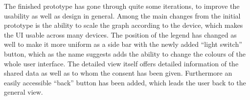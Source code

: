 \documentclass[../paper.tex]{subfiles}
\begin{document}
  The finished prototype has gone through quite some iterations, to improve
  the usability as well as design in general. Among the main changes from the
  initial prototype is the ability to scale the graph according to the device, which
  makes the UI usable across many devices. The position of the legend has changed
  as well to make it more uniform as a side bar with the newly added ``light switch''
  button, which as the name suggests adds the ability to change the colours of
  the whole user interface. The detailed view itself offers detailed information
  of the shared data as well as to whom the consent has been given. Furthermore
  an easily accessible ``back'' button has been added, which leads the user back
  to the general view.
\end{document}
